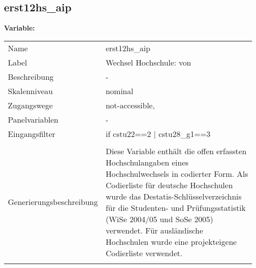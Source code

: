 	
	
	\subsection{erst12hs\_aip}
	\label{subSection:erst12hs_aip}

	\noindent\textbf{Variable:}\\
		\begin{tabular}{lL{11.3cm}}
			\label{tableVariable:erst12hs_aip}
			Name & erst12hs\_aip \\
			Label & Wechsel Hochschule: von  \\
			Beschreibung & - \\
			Skalenniveau & nominal \\
			Zugangswege &
				not-accessible,
 \\
			Panelvariablen & -
			 \\
			Eingangsfilter & if cstu22==2 | cstu28\_g1==3 \\
 \\
					Generierungsbeschreibung & Diese Variable enthält die offen erfassten Hochschulangaben eines Hochschulwechsels in codierter Form. Als Codierliste für deutsche Hochschulen wurde das Destatis-Schlüsselverzeichnis für die Studenten- und Prüfungsstatistik (WiSe 2004/05 und SoSe 2005) verwendet. Für ausländische Hochschulen wurde eine projekteigene Codierliste verwendet.
				 \\	
			 \\
		\end{tabular}






	
	\newpage
